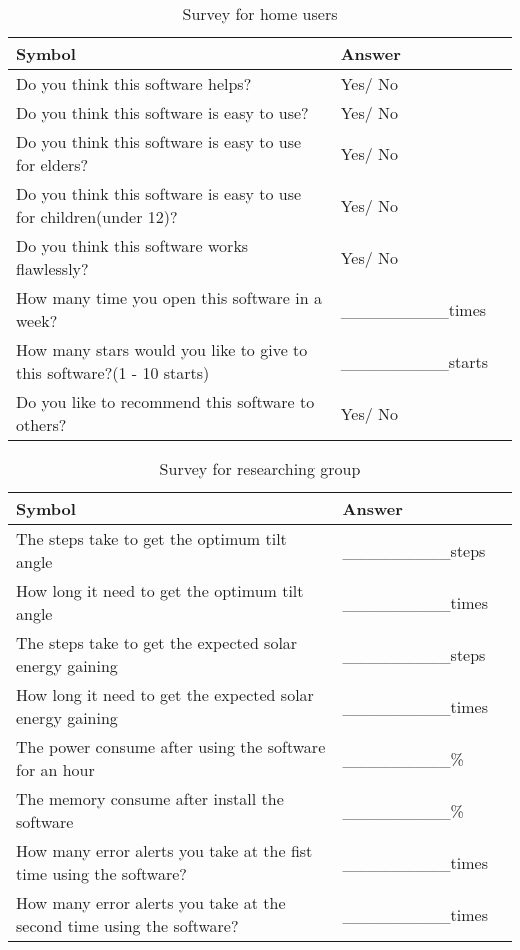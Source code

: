 \documentclass[12pt, titlepage]{article}
\begin{document}
\begin{table}[h!]
  \noindent \begin{tabular}{l l l} 
    \toprule		
    \textbf{Symbol} & \textbf{Answer} \\
    \midrule 
    Do you think this software helps? & Yes/ No  \\
    Do you think this software is easy to use? & Yes/ No  \\
    Do you think this software is easy to use for elders? & Yes/ No  \\
    Do you think this software is easy to use for children(under 12)? & Yes/ No  \\
    Do you think this software works flawlessly? & Yes/ No  \\
    How many time you open this software in a week? & \_\_\_\_\_\_\_\_\_times  \\
	 How many stars  would you like to give to this software?(1 - 10 starts) & \_\_\_\_\_\_\_\_\_starts  \\
    Do you like to recommend  this software to others? & Yes/ No  \\
    \bottomrule
  \end{tabular}
  \caption{Survey for home users}
\end{table}

\begin{table}[h!]
  \noindent \begin{tabular}{l l l} 
    \toprule		
    \textbf{Symbol} & \textbf{Answer} \\
    \midrule 
    The steps take to get the optimum tilt angle & \_\_\_\_\_\_\_\_\_steps  \\
    How long it need to get the optimum tilt angle & \_\_\_\_\_\_\_\_\_times  \\
    The steps take to get the expected solar energy gaining & \_\_\_\_\_\_\_\_\_steps  \\
    How long it need to get the expected solar energy gaining & \_\_\_\_\_\_\_\_\_times  \\
    The power consume after using the software for an hour & \_\_\_\_\_\_\_\_\_\%  \\
    The memory consume after install the software  & \_\_\_\_\_\_\_\_\_\%  \\
    How many error alerts you take at the fist time using the software? & \_\_\_\_\_\_\_\_\_times  \\
    How many error alerts you take at the second time using the software? & \_\_\_\_\_\_\_\_\_times  \\
    \bottomrule
  \end{tabular}
  \caption{Survey for researching  group}
\end{table}
\end{document}
